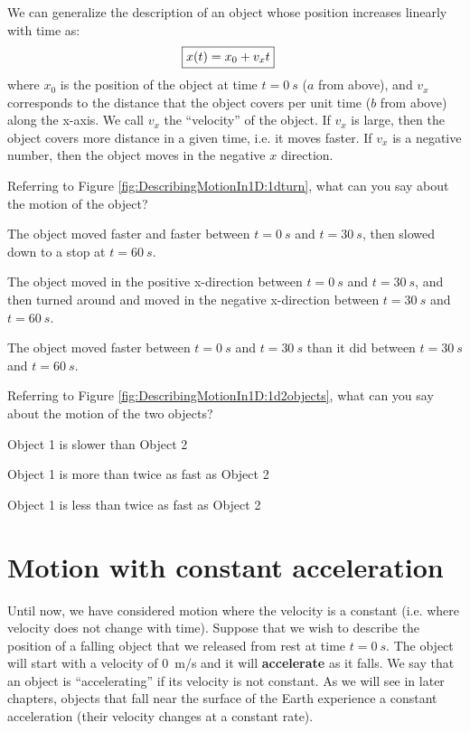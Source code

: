 We can generalize the description of an object whose position increases linearly with time as:
\begin{align}
\label{eqn:DescribingMotionIn1D:1dxvst_noa}
\Aboxed{x(t) = x_0 + v_xt}
\end{align}
where $x_0$ is the position of the object at time $t=\SI{0}{s}$ ($a$ from above), and $v_x$ corresponds to the distance that the object covers per unit time ($b$ from above) along the x-axis. We call $v_x$ the ``velocity'' of the object. If $v_x$ is large, then the object covers more distance in a given time, i.e. it moves faster. If $v_x$ is a negative number, then the object moves in the negative $x$ direction.

\begin{checkpointMC}{Referring to Figure \ref{fig:DescribingMotionIn1D:1dturn}, what can you say about the motion of the object? }
\item The object moved faster and faster between $t=\SI{0}{s}$ and $t=\SI{30}{s}$, then slowed down to a stop at $t=\SI{60}{s}$.
\item The object moved in the positive x-direction between $t=\SI{0}{s}$ and $t=\SI{30}{s}$, and then turned around and moved in the negative x-direction between $t=\SI{30}{s}$ and $t=\SI{60}{s}$. %
\item The object moved faster between $t=\SI{0}{s}$ and $t=\SI{30}{s}$ than it did between $t=\SI{30}{s}$ and $t=\SI{60}{s}$.
\end{checkpointMC}

\begin{checkpointMC}{Referring to Figure \ref{fig:DescribingMotionIn1D:1d2objects}, what can you say about the motion of the two objects? }
\item Object 1 is slower than Object 2
\item Object 1 is more than twice as fast as Object 2 %
\item Object 1 is less than twice as fast as Object 2
\end{checkpointMC}

\section{Motion with constant acceleration}
Until now, we have considered motion where the velocity is a constant (i.e. where velocity does not change with time). Suppose that we wish to describe the position of a falling object that we released from rest at time $t=\SI{0}{s}$. The object will start with a velocity of \SI{0}{m/s} and it will \textbf{accelerate} as it falls. We say that an object is ``accelerating'' if its velocity is not constant. As we will see in later chapters, objects that fall near the surface of the Earth experience a constant acceleration (their velocity changes at a constant rate).

